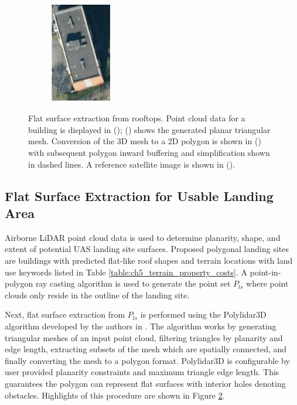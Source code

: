 \begin{figure}[t]
\begin{subfigure}[b]{0.5\linewidth}
    \centering\includegraphics[width=75pt,height=125pt]{chapter_5_mapping/imgs/74200284_satellite_simple.pdf}
    \caption{\label{fig:ch5_satellite_example}}
  \end{subfigure}%
  \caption[Flat surface extraction from rooftops]{Flat surface extraction from rooftops. Point cloud data for a building is displayed in (); () shows the generated planar triangular mesh.  Conversion of the 3D mesh to a 2D polygon is shown in () with subsequent polygon inward buffering and simplification shown in dashed lines.  A reference satellite image is shown in ().}
  \label{fig:ch5_example_usable}
\end{figure}

\subsection{Flat Surface Extraction for Usable Landing Area}\label{sec:ch5_usable_area}

Airborne LiDAR point cloud data is used to determine planarity, shape, and extent of potential \ac{UAS} landing site surfaces.  %
Proposed polygonal landing sites are buildings with predicted flat-like roof shapes and terrain locations with land use keywords listed in Table \ref{table:ch5_terrain_property_costs}.  A point-in-polygon ray casting algorithm is used to generate the point set $P_{ls}$ \cite{samosky_sectionviewsystem_1993} where point clouds only reside in the outline of the landing site. 

Next, flat surface extraction from $P_{ls}$ is performed using the Polylidar3D algorithm developed by the authors in \cite{castagno_polylidar3d_2020}. The algorithm works by generating triangular meshes of an input point cloud, filtering triangles by planarity and edge length, extracting subsets of the mesh which are spatially connected, and finally converting the mesh to a polygon format. Polylidar3D is configurable by user provided planarity constraints and maximum triangle edge length. This guarantees the polygon can represent flat surfaces with interior holes denoting obstacles. Highlights of this procedure are shown in Figure \ref{fig:ch5_example_usable}. 

